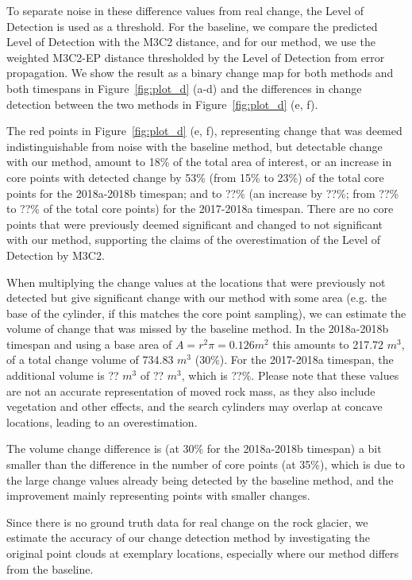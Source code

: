 \documentclass[preprint,12pt,3p]{elsarticle}
\begin{document}
To separate noise in these difference values from real change, the Level of Detection is used as a threshold. For the baseline, we compare the predicted Level of Detection with the M3C2 distance, and for our method, we use the weighted M3C2-EP distance thresholded by the Level of Detection from error propagation. We show the result as a binary change map for both methods and both timespans in Figure~\ref{fig:plot_d} (a-d) and the differences in change detection between the two methods in Figure~\ref{fig:plot_d} (e, f).
 
 The red points in Figure~\ref{fig:plot_d} (e, f), representing change that was deemed indistinguishable from noise with the baseline method, but detectable change with our method, amount to 18\% of the total area of interest, or an increase in core points with detected change by 53\% (from 15\% to 23\%) of the total core points for the 2018a-2018b timespan; and to ??\% (an increase by ??\%; from ??\% to ??\% of the total core points) for the 2017-2018a timespan. There are no core points that were previously deemed significant and changed to not significant with our method, supporting the claims of the overestimation of the Level of Detection by M3C2.
 
When multiplying the change values at the locations that were previously not detected but give significant change with our method with some area (e.g. the base of the cylinder, if this matches the core point sampling), we can estimate the volume of change that was missed by the baseline method. In the 2018a-2018b timespan and using a base area of $A=r^2\pi=0.126m^2$ this amounts to 217.72 $m^3$, of a total change volume of 734.83 $m^3$ (30\%). For the 2017-2018a timespan, the additional volume is ?? $m^3$ of ?? $m^3$, which is ??\%. Please note that these values are not an accurate representation of moved rock mass, as they also include vegetation and other effects, and the search cylinders may overlap at concave locations, leading to an overestimation. 

The volume change difference is (at 30\% for the 2018a-2018b timespan) a bit smaller than the difference in the number of core points (at 35\%), which is due to the large change values already being detected by the baseline method, and the improvement mainly representing points with smaller changes.

Since there is no ground truth data for real change on the rock glacier, we estimate the accuracy of our change detection method by investigating the original point clouds at exemplary locations, especially where our method differs from the baseline. 
\end{document}
